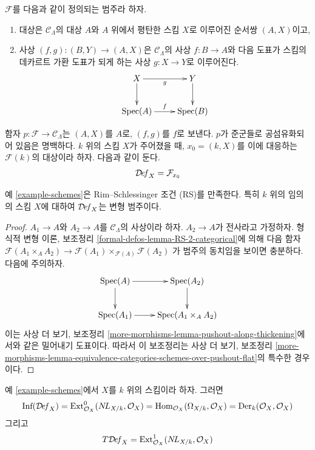 \begin{example}[스킴]
\label{example-schemes}
$\mathcal{F}$를 다음과 같이 정의되는 범주라 하자.
\begin{enumerate}
\item 대상은 $\mathcal{C}_\Lambda$의 대상 $A$와 $A$ 위에서 평탄한 스킴
$X$로 이루어진 순서쌍 $(A, X)$이고,
\item 사상 $(f, g) : (B, Y) \to (A, X)$은
$\mathcal{C}_\Lambda$의 사상 $f : B \to A$와 다음 도표가 스킴의
데카르트 가환 도표가 되게 하는 사상 $g : X \to Y$로 이루어진다.
$$
\xymatrix{
X \ar[r]_g \ar[d] & Y \ar[d] \\
\Spec(A) \ar[r]^f & \Spec(B)
}
$$
\end{enumerate}
함자 $p : \mathcal{F} \to \mathcal{C}_\Lambda$는 $(A, X)$를 $A$로,
$(f, g)$를 $f$로 보낸다. $p$가 준군들로 공섬유화되어 있음은 명백하다.
$k$ 위의 스킴 $X$가 주어졌을 때, $x_0 = (k, X)$를 이에 대응하는
$\mathcal{F}(k)$의 대상이라 하자. 다음과 같이 둔다.
$$
\mathcal{D}\!\mathit{ef}_X = \mathcal{F}_{x_0}
$$
\end{example}

\begin{lemma}
\label{lemma-schemes-RS}
예 \ref{example-schemes}은 Rim--Schlessinger 조건 (RS)를 만족한다.
특히 $k$ 위의 임의의 스킴 $X$에 대하여 $\mathcal{D}\!\mathit{ef}_X$는
변형 범주이다.
\end{lemma}

\begin{proof}
$A_1 \to A$와 $A_2 \to A$를 $\mathcal{C}_\Lambda$의 사상이라 하자.
$A_2 \to A$가 전사라고 가정하자. 형식적 변형 이론, 보조정리
\ref{formal-defos-lemma-RS-2-categorical}에 의해 다음 함자
$\mathcal{F}(A_1 \times_A A_2) \to
\mathcal{F}(A_1) \times_{\mathcal{F}(A)} \mathcal{F}(A_2)$
가 범주의 동치임을 보이면 충분하다. 다음에 주의하자.
$$
\xymatrix{
\Spec(A) \ar[r] \ar[d] & \Spec(A_2) \ar[d] \\
\Spec(A_1) \ar[r] &
\Spec(A_1 \times_A A_2)
}
$$
이는 사상 더 보기, 보조정리
\ref{more-morphisms-lemma-pushout-along-thickening}에서와 같은 밀어내기
도표이다. 따라서 이 보조정리는 사상 더 보기, 보조정리
\ref{more-morphisms-lemma-equivalence-categories-schemes-over-pushout-flat}의
특수한 경우이다.
\end{proof}

\begin{lemma}
\label{lemma-schemes-TI}
예 \ref{example-schemes}에서 $X$를 $k$ 위의 스킴이라 하자. 그러면
$$
\text{Inf}(\mathcal{D}\!\mathit{ef}_X) =
\text{Ext}^0_{\mathcal{O}_X}(\mathop{N\!L}\nolimits_{X/k}, \mathcal{O}_X) =
\mathop{\mathrm{Hom}}\nolimits_{\mathcal{O}_X}(\Omega_{X/k}, \mathcal{O}_X) =
\text{Der}_k(\mathcal{O}_X, \mathcal{O}_X)
$$
그리고
$$
T\mathcal{D}\!\mathit{ef}_X =
\text{Ext}^1_{\mathcal{O}_X}(\mathop{N\!L}\nolimits_{X/k}, \mathcal{O}_X)
$$
\end{lemma}


